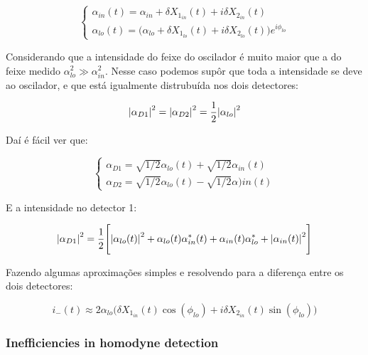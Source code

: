 \documentclass[12pt,a4paper]{report}
\begin{document}
\begin{equation}
    \begin{cases}
        \alpha_{in}(t)=\alpha_{in}+\delta X_1_{in}(t)+i\delta X_2_{in}(t)\\
        \alpha_{lo}(t)=\big(\alpha_{lo}+\delta X_1_{lo}(t)+i\delta X_2_{lo}(t)\big)e^{i\phi_{lo}}
    \end{cases}
\end{equation}

Considerando que a intensidade do feixe do oscilador é muito maior que a do feixe medido $\alpha_{lo}^2\gg\alpha_{in}^2$. Nesse caso podemos supôr que toda a intensidade se deve ao oscilador, e que está igualmente distrubuída nos dois detectores:

\begin{equation}
    \abs{\alpha_{D1}}^2=\abs{\alpha_{D2}}^2=\frac{1}{2}\abs{\alpha_{lo}}^2
\end{equation}

Daí é fácil ver que:

\begin{equation}
    \begin{cases}
        \alpha_{D1}=\sqrt{1/2}\alpha_{lo}(t)+\sqrt{1/2}\alpha_{in}(t)\\
        \alpha_{D2}=\sqrt{1/2}\alpha_{lo}(t)-\sqrt{1/2}\alpha){in}(t)
    \end{cases}
\end{equation}

E a intensidade no detector 1:

\begin{equation}
    \abs{\alpha_{D1}}^2=\frac{1}{2}\Bigg[ \abs{\alpha_{lo}(t)}^2+\alpha_{lo}(t)\alpha^*_{in}(t)+\alpha_{in}(t)\alpha^*_{lo}+\abs{\alpha_{in}(t)}^2\Bigg]
\end{equation}

Fazendo algumas aproximações simples e resolvendo para a diferença entre os dois detectores:             

\begin{equation}
    i_{-}(t)\approx 2\alpha_{lo}\big(\delta X_1_{in}(t)\cos(\phi_{lo})+i\delta X_2_{in}(t)\sin(\phi_{lo})\big)
\end{equation}




\subsubsection{Inefficiencies in homodyne detection}
\end{document}
